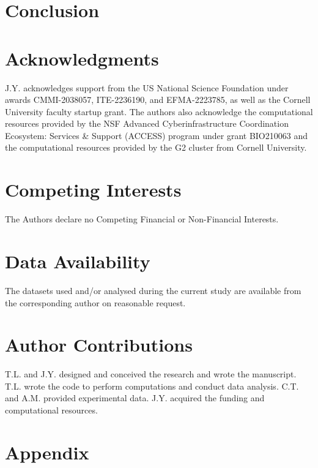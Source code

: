 \documentclass{article}
\begin{document}
\section{Conclusion}


\section*{Acknowledgments}
J.Y. acknowledges support from the US National Science Foundation under awards CMMI-2038057, ITE-2236190, and EFMA-2223785, as well as the Cornell University faculty startup grant. The authors also acknowledge the computational resources provided by the NSF Advanced Cyberinfrastructure Coordination Ecosystem: Services \& Support (ACCESS) program under grant BIO210063 and the computational resources provided by the G2 cluster from Cornell University.

\section*{Competing Interests}

The Authors declare no Competing Financial or Non-Financial Interests.

\section*{Data Availability}

The datasets used and/or analysed during the current study are available from the corresponding author on reasonable request.

\section*{Author Contributions}

T.L. and J.Y. designed and conceived the research and wrote the manuscript. T.L. wrote the code to perform computations and conduct data analysis. C.T. and A.M. provided experimental data. J.Y. acquired the funding and computational resources.


 
\newpage

\section*{Appendix}

\end{document}
